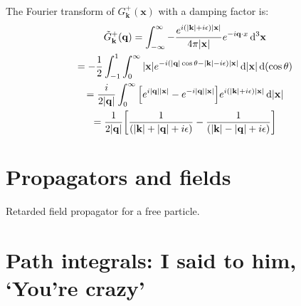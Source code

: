 \documentclass{report}
\begin{document}
\begin{subquests}
\begin{subquests}
		\item The Fourier transform of $G^+_{\mathbf k}(\mathbf x)$ with a damping factor is:
		\begin{gather*}
			\tilde G^+_{\mathbf k}(\mathbf q) = \int_{-\infty}^{\infty} -\frac{e^{i\pqty{\abs{\mathbf k} + i\epsilon}\abs{\mathbf x}}}{4\pi\abs{\mathbf x}}e^{-i\vb q\cdot x}\,\dd^3{\vb x} \\ 
			= -\frac{1}{2}\int_{-1}^{1}\int_0^{\infty}{\abs{\mathbf x}e^{-i\pqty{\abs{\mathbf q}\cos\theta -\abs{\mathbf k} - i\epsilon}\abs{\mathbf x}}} \dd{\abs{\mathbf x}}\dd\pqty{\cos\theta} \\
			= \frac{i}{2\abs{\mathbf q}}\int_{0}^{\infty} \bqty{e^{i\abs{\mathbf q}\abs{\mathbf x}}- e^{-i\abs{\mathbf q}\abs{\mathbf x}}}e^{i\pqty{\abs{\mathbf k} + i\epsilon}\abs{\mathbf x}} \dd{\abs{\mathbf x}} \\
			= \frac{1}{2\abs{\vb q}}\bqty{\frac{1}{\pqty{\abs{\vb k} + \abs{\vb q} + i\epsilon}}- \frac{1}{ \pqty{\abs{\vb k} - \abs{\vb q} + i\epsilon}}}
		\end{gather*}

		\item
	\end{subquests}
\end{subquests}


\chapter{Propagators and fields}

\begin{subquests}
	\item Retarded field propagator for a free particle.

\end{subquests}


\chapter{Path integrals: I said to him, `You're crazy'}
\end{document}

